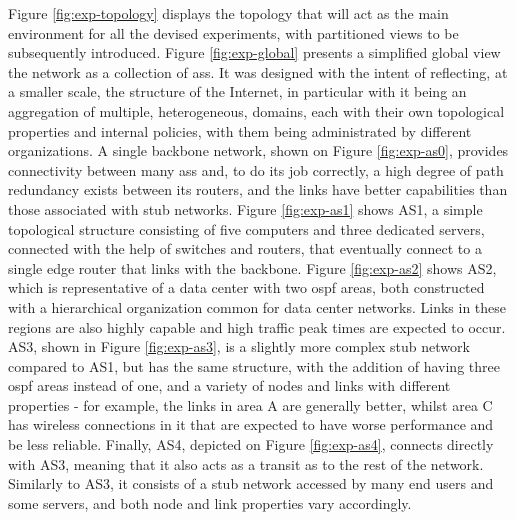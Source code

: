     Figure \ref{fig:exp-topology} displays the topology that will act as the main environment for all the devised experiments, with partitioned views to be subsequently introduced.
    Figure \ref{fig:exp-global} presents a simplified global view the network as a collection of \glspl{as}.
    It was designed with the intent of reflecting, at a smaller scale, the structure of the Internet, in particular with it being an aggregation of multiple, heterogeneous, domains, each with their own topological properties and internal policies, with them being administrated by different organizations.
    A single backbone network, shown on Figure \ref{fig:exp-as0}, provides connectivity between many \glspl{as} and, to do its job correctly, a high degree of path redundancy exists between its routers, and the links have better capabilities than those associated with stub networks.
    Figure \ref{fig:exp-as1} shows AS1, a simple topological structure consisting of five computers and three dedicated servers, connected with the help of switches and routers, that eventually connect to a single edge router that links with the backbone.
    Figure \ref{fig:exp-as2} shows AS2, which is representative of a data center with two \gls{ospf} areas, both constructed with a hierarchical organization common for data center networks.
    Links in these regions are also highly capable and high traffic peak times are expected to occur.
    AS3, shown in Figure \ref{fig:exp-as3}, is a slightly more complex stub network compared to AS1, but has the same structure, with the addition of having three \gls{ospf} areas instead of one, and a variety of nodes and links with different properties - for example, the links in area A are generally better, whilst area C has wireless connections in it that are expected to have worse performance and be less reliable.
    Finally, AS4, depicted on Figure \ref{fig:exp-as4}, connects directly with AS3, meaning that it also acts as a transit \gls{as} to the rest of the network.
    Similarly to AS3, it consists of a stub network accessed by many end users and some servers, and both node and link properties vary accordingly.

